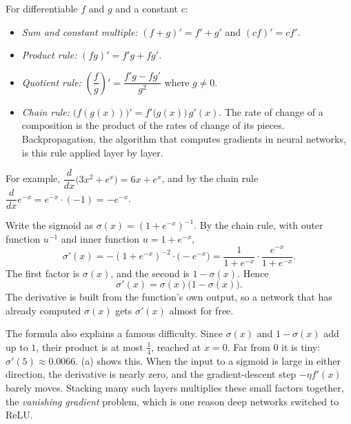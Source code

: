 For differentiable $f$ and $g$ and a constant $c$:
\begin{itemize}
  \item \emph{Sum and constant multiple:}
    $(f + g)' = f' + g'$ and $(c f)' = c f'$.
  \item \emph{Product rule:} $(f g)' = f' g + f g'$.
  \item \emph{Quotient rule:} $\left(\dfrac{f}{g}\right)' =
    \dfrac{f' g - f g'}{g^2}$ where $g \ne 0$.
  \item \emph{Chain rule:} $\bigl(f(g(x))\bigr)' = f'\bigl(g(x)\bigr)\,
    g'(x)$. The rate of change of a composition is the product of the
    rates of change of its pieces. Backpropagation, the algorithm that
    computes gradients in neural networks, is this rule applied layer by
    layer.
\end{itemize}
For example, $\dfrac{d}{dx}\bigl(3x^2 + e^x\bigr) = 6x + e^x$, and by the
chain rule $\dfrac{d}{dx} e^{-x} = e^{-x} \cdot (-1) = -e^{-x}$.

\begin{example}
  \label{ex:ch02-sigmoid}
  Write the sigmoid as $\sigma(x) = (1 + e^{-x})^{-1}$. By the chain rule,
  with outer function $u^{-1}$ and inner function $u = 1 + e^{-x}$,
  \[
    \sigma'(x) = -(1 + e^{-x})^{-2} \cdot \bigl(-e^{-x}\bigr)
    = \frac{1}{1 + e^{-x}} \cdot \frac{e^{-x}}{1 + e^{-x}}.
  \]
  The first factor is $\sigma(x)$, and the second is
  $1 - \sigma(x)$. Hence
  \[
    \sigma'(x) = \sigma(x)\bigl(1 - \sigma(x)\bigr).
  \]
  The derivative is built from the function's own output, so a network
  that has already computed $\sigma(x)$ gets $\sigma'(x)$ almost for free.
\end{example}

The formula also explains a famous difficulty. Since $\sigma(x)$ and
$1 - \sigma(x)$ add up to $1$, their product is at most $\tfrac14$,
reached at $x = 0$. Far from $0$ it is tiny: $\sigma'(5) \approx 0.0066$.
(a) shows this. When the input to a
sigmoid is large in either direction, the derivative is nearly zero, and
the gradient-descent step $-\eta f'(x)$ barely moves. Stacking many such
layers multiplies these small factors together, the \emph{vanishing
gradient} problem, which is one reason deep networks switched to ReLU.

